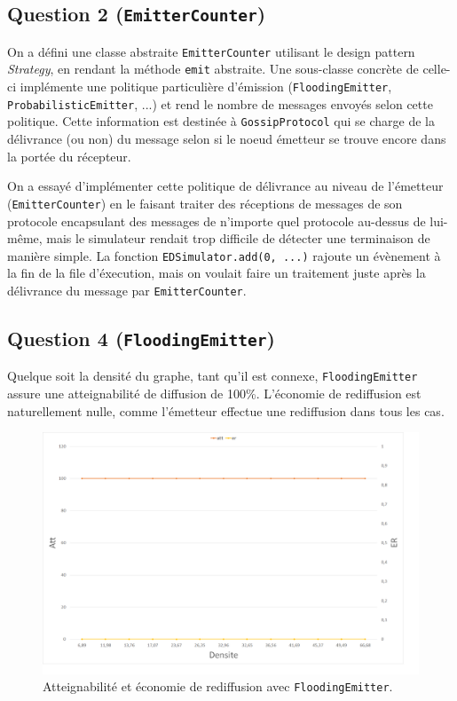 \documentclass[a4paper]{article}
\begin{document}
\pagebreak

\subsection{Question 2 (\texttt{EmitterCounter})}
On a défini une classe abstraite \texttt{EmitterCounter} utilisant le
design pattern \textsl{Strategy}, en rendant la méthode \texttt{emit}
abstraite. Une sous-classe concrète de celle-ci implémente une politique particulière d'émission
(\texttt{FloodingEmitter}, \texttt{ProbabilisticEmitter}, ...) et rend
le nombre de messages envoyés selon cette politique.
Cette information est destinée à \texttt{GossipProtocol} qui se charge
de la délivrance (ou non) du message selon si le noeud émetteur se
trouve encore dans la portée du récepteur.

On a essayé d'implémenter
cette politique de délivrance au niveau de l'émetteur
(\texttt{EmitterCounter}) en le faisant traiter des réceptions de
messages de son protocole encapsulant des messages de n'importe quel
protocole au-dessus de lui-même, mais le simulateur rendait trop difficile de détecter
une terminaison de manière simple. La fonction \texttt{EDSimulator.add(0, ...)}
rajoute un évènement à la fin de la file d'éxecution, mais on voulait
faire un traitement juste après la délivrance du message par
\texttt{EmitterCounter}.

\vfill

\subsection{Question 4 (\texttt{FloodingEmitter})}
Quelque soit la densité du graphe, tant qu'il est connexe,
\texttt{FloodingEmitter} assure une atteignabilité de diffusion de
100\%. L'économie de rediffusion est naturellement nulle, comme
l'émetteur effectue une rediffusion dans tous les cas.



\begin{figure}[H]
\begin{minipage}{\textwidth}
  \centering
    \includegraphics[width=\textwidth]{images/ex2q4.png}
    \caption{Atteignabilité et économie de rediffusion avec \texttt{FloodingEmitter}.}
\end{minipage}
\end{figure}
\end{document}
